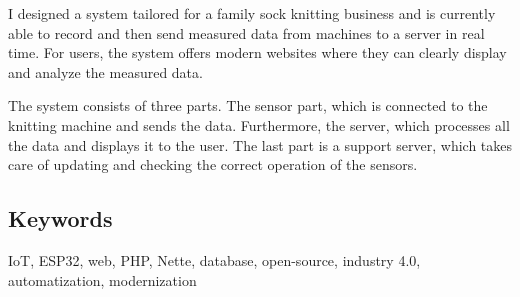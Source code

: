 \documentclass{template/socthesis}
\begin{document}
I designed a system tailored for a family sock knitting business and is currently able to record and then send measured data from machines to a server in real time. 
For users, the system offers modern websites where they can clearly display and analyze the measured data.

The system consists of three parts. The sensor part, which is connected to the knitting machine and sends the data. 
Furthermore, the server, which processes all the data and displays it to the user. The last part is a support server, which takes care of updating and checking the correct operation of the sensors.  

\subsection*{Keywords}
IoT, ESP32, web, PHP, Nette, database, open-source, industry 4.0, automatization, modernization

\newpage
\pagestyle{plain}

\tableofcontents %

\setcounter{figure}{0}
\setcounter{table}{0}
\newpage



% 















 












% 





\newpage



\appendix
{}






% 


% 


% 



\printbibliography[title=Literatura]


\listoffigures
{}

\listoftables
{}
\end{document}
